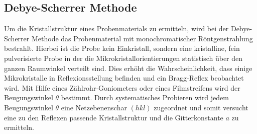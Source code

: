 \subsection{Debye-Scherrer Methode}
\label{subsec:Methoden}
Um die Kristallstruktur eines Probenmaterials
zu ermitteln, wird bei der Debye-Scherrer Methode
das Probenmaterial mit monochromatischer
Röntgenstrahlung bestrahlt.
Hierbei ist die Probe kein
Einkristall, sondern eine
kristalline, fein pulverisierte Probe
in der die Mikrokristallorientierungen statistisch
über den ganzen Raumwinkel verteilt sind.
Dies erhöht die Wahrscheinlichkeit, dass
einige Mikrokristalle in Reflexionsstellung
befinden und ein Bragg-Reflex beobachtet wird.
Mit Hilfe eines
Zählrohr-Goniometers oder
eines Filmstreifens wird der Beugungswinkel $\theta$
bestimmt. Durch systematisches Probieren wird
jedem Beugungswinkel $\theta$ eine Netzebenenschar
${(h k l)}$ zugeordnet und somit versucht
eine zu den Reflexen passende Kristallstruktur und
die Gitterkonstante $a$
zu ermitteln.
